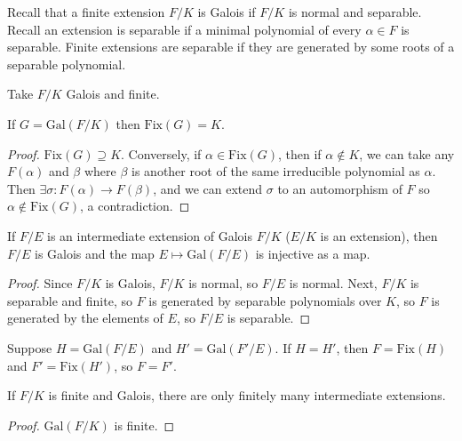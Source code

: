 \documentclass[a4paper,twoside,master.tex]{subfiles}
\begin{document}

Recall that a finite extension $ F/K $ is Galois if $ F/K $ is normal and separable. Recall an extension is separable if a minimal polynomial of every $ \alpha \in F $ is separable. Finite extensions are separable if they are generated by some roots of a separable polynomial.

Take $ F/K $ Galois and finite.
\begin{claim}
    If $ G = \text{Gal}(F/K) $ then $ \text{Fix}(G) = K $.
\end{claim}
\begin{proof}
    $ \text{Fix}(G) \supseteq K $. Conversely, if $ \alpha \in \text{Fix}(G) $, then if $ \alpha \notin K $, we can take any $ F(\alpha) $ and $ \beta $ where $ \beta $ is another root of the same irreducible polynomial as $\alpha$. Then $ \exists \sigma \colon F(\alpha) \to F(\beta) $, and we can extend $ \sigma $ to an automorphism of $ F $ so $ \alpha \notin \text{Fix}(G) $, a contradiction.
\end{proof}

\begin{claim}
    If $ F/E $ is an intermediate extension of Galois $ F/K $ ($ E/K $ is an extension), then $ F/E $ is Galois and the map $ E \mapsto \text{Gal}(F/E) $ is injective as a map.
\end{claim}
\begin{proof}
    Since $ F/K $ is Galois, $ F/K $ is normal, so $ F/E $ is normal. Next, $ F/K $ is separable and finite, so $ F $ is generated by separable polynomials over $ K $, so $ F $ is generated by the elements of $ E $, so $ F/E $ is separable.
\end{proof}

Suppose $ H = \text{Gal}(F/E) $ and $ H' = \text{Gal}(F'/E) $. If $ H=H' $, then $ F = \text{Fix}(H) $ and $ F' = \text{Fix}(H') $, so $ F = F' $.

\begin{corollary}
    If $ F/K $ is finite and Galois, there are only finitely many intermediate extensions.
\end{corollary}
\begin{proof}
    $ \text{Gal}(F/K) $ is finite.
\end{proof}
\end{document}
